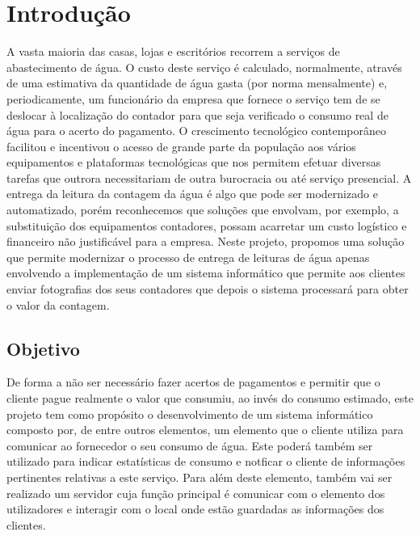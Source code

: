 %
%
\chapter{Introdução} \label{cap:intro}

A vasta maioria das casas, lojas e escritórios recorrem a serviços de abastecimento de água. O custo deste serviço é calculado, normalmente, através de uma estimativa da quantidade de água gasta (por norma mensalmente) e, periodicamente, um funcionário da empresa que fornece o serviço tem de se deslocar à localização do contador para que seja verificado o consumo real de água para o acerto do pagamento. 
O crescimento tecnológico contemporâneo facilitou e incentivou o acesso de grande parte da população aos vários equipamentos e plataformas tecnológicas que nos permitem efetuar diversas tarefas que outrora necessitariam de outra burocracia ou até serviço presencial. A entrega da leitura da contagem da água é algo que pode ser modernizado e automatizado, porém reconhecemos que soluções que envolvam, por exemplo, a substituição dos equipamentos contadores, possam acarretar um custo logístico e financeiro não justificável para a empresa. 
Neste projeto, propomos uma solução que permite modernizar o processo de entrega de leituras de água apenas envolvendo a implementação de um sistema informático que permite aos clientes enviar fotografias dos seus contadores que depois o sistema processará para obter o valor da contagem.


%
%
\section{Objetivo} \label{sec11}

De forma a não ser necessário fazer acertos de pagamentos e permitir que o cliente pague realmente o valor que consumiu, ao invés do consumo estimado, este projeto tem como propósito o desenvolvimento de um sistema informático composto por, de entre outros elementos, um elemento que o cliente utiliza para comunicar ao fornecedor o seu consumo de água. Este poderá também ser utilizado para indicar estatísticas de consumo e notficar o cliente de informações pertinentes relativas a este serviço. Para além deste elemento, também vai ser realizado um servidor cuja função principal é comunicar com o elemento dos utilizadores e interagir com o local onde estão guardadas as informações dos clientes.

